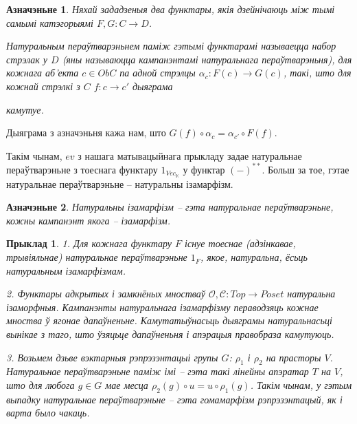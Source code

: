 \documentclass[a4paper,12pt]{book}
\newtheorem{example}{Прыклад}[section]
\newtheorem{definition}{Азначэньне}[section]
\begin{document}
\begin{definition}
  Няхай зададзеныя два функтары, якія дзейнічаюць між тымі самымі
  катэгорыямі $F, G: C \rightarrow D$.

  Натуральным пераўтварэньнем
  паміж гэтымі функтарамі называецца набор стрэлак у $D$ (яны
  называюцца кампанэнтамі натуральнага пераўтварэньня), для
  кожнага аб'екта $c \in Ob C$ па адной стрэлцы $\alpha_c: F(c)
  \rightarrow G(c)$, такі, што для кожнай стрэлкі з $C$ $f:c
  \rightarrow c'$ дыяграма


  камутуе.

\end{definition}

Дыяграма з азначэньня кажа нам, што $G(f) \circ \alpha_c = \alpha_{c'}
\circ F(f)$.

Такім чынам, $ev$ з нашага матывацыйнага прыкладу задае натуральнае
пераўтварэньне з тоеснага функтару $1_{Vec_{\mathbb{K}}}$ у функтар
$(-)^{**}$. Больш за тое, гэтае натуральнае пераўтварэньне --
натуральны ізамарфізм.

\begin{definition}
  Натуральны ізамарфізм -- гэта натуральнае пераўтварэньне, кожны
  кампанэнт якога -- ізамарфізм.
\end{definition}

\begin{example}
  1. Для кожнага функтару $F$ існуе тоеснае (адзінкавае, трывіяльнае)
  натуральнае пераўтварэньне
  $1_F$, якое, натуральна, ёсьць натуральным ізамарфізмам.

  2. Функтары адкрытых і замкнёных мностваў $\mathcal{O}, \mathcal{C}:
  Top \rightarrow Poset$ натуральна ізаморфныя. Кампанэнты
  натуральнага ізамарфізму пераводзяць кожнае мноства ў ягонае
  дапаўненьне. Камутатыўнасьць дыяграмы натуральнасьці вынікае з таго,
  што ўзяцьце дапаўненьня і апэрацыя правобраза камутуюць.

  3. Возьмем дзьве вэктарныя рэпрэзэнтацыі групы $G$: $\rho_1$ і
  $\rho_2$ на прасторы $V$. Натуральнае пераўтварэньне паміж імі --
  гэта такі лінейны апэратар $T$ на $V$, што для любога $g \in G$
  мае месца $\rho_2(g) \circ u = u \circ \rho_1(g)$. Такім чынам, у
  гэтым выпадку натуральнае пераўтварэньне -- гэта гомамарфізм
  рэпрэзэнтацый, як і варта было чакаць.
\end{example}
\end{document}
